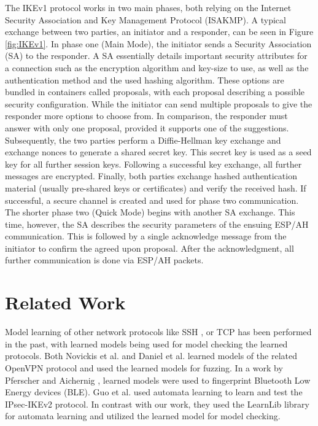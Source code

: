 \documentclass[runningheads]{llncs}
\begin{document}
The IKEv1 protocol works in two main phases, both relying on the Internet Security Association and Key Management Protocol (ISAKMP). A typical exchange between two parties, an initiator and a responder, can be seen in Figure \ref{fig:IKEv1}. In phase one (Main Mode), the initiator sends a Security Association (SA) to the responder. A SA essentially details important security attributes for a connection such as the encryption algorithm and key-size to use, as well as the authentication method and the used hashing algorithm. These options are bundled in containers called proposals, with each proposal describing a possible security configuration. While the initiator can send multiple proposals to give the responder more options to choose from. In comparison, the responder must answer with only one proposal, provided it supports one of the suggestions. Subsequently, the two parties perform a Diffie-Hellman key exchange and exchange nonces to generate a shared secret key. This secret key is used as a seed key for all further session keys. Following a successful key exchange, all further messages are encrypted. Finally, both parties exchange hashed authentication material (usually pre-shared keys or certificates) and verify the received hash. If successful, a secure channel is created and used for phase two communication.
The shorter phase two (Quick Mode) begins with another SA exchange. This time, however, the SA describes the security parameters of the ensuing ESP/AH communication. This is followed by a single acknowledge message from the initiator to confirm the agreed upon proposal. After the acknowledgment, all further communication is done via ESP/AH packets. 


\section{Related Work} \label{chap:3} %
Model learning of other network protocols like SSH \cite{fiteruau2017model}, or TCP \cite{fiteruau2016combining} has been performed in the past, with learned models being used for model checking the learned protocols. Both Novickis et al. \cite{novickis2016protocol} and Daniel et al. \cite{daniel2018inferring} learned models of the related OpenVPN protocol \cite{novickis2016protocol} and used the learned models for fuzzing. In a work by Pferscher and Aichernig \cite{pferscher2021fingerprinting}, learned models were used to fingerprint Bluetooth Low Energy devices (BLE). Guo et al. \cite{guo2019model} used automata learning to learn and test the IPsec-IKEv2 protocol. In contrast with our work, they used the LearnLib library for automata learning and utilized the learned model for model checking.
\end{document}

